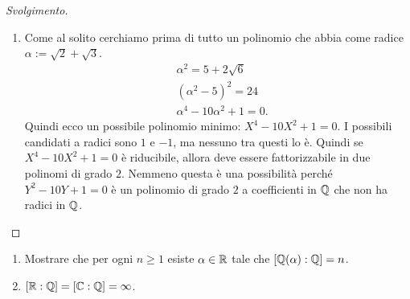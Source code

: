 \begin{proof}[Svolgimento]
\begin{enumerate}
\item Come al solito cerchiamo prima di tutto un polinomio che abbia come radice \(\alpha := \sqrt2 + \sqrt3\).
\begin{align*}
& \alpha^2=5+2\sqrt{6} \\
& (\alpha^2 - 5)^2 = 24 \\
& \alpha^4 -10\alpha^2+1 = 0 .
\end{align*}
Quindi ecco un possibile polinomio minimo: \(X^4 -10X^2+1 = 0\). I possibili candidati a radici sono \(1\) e \(-1\), ma nessuno tra questi lo è. Quindi se \(X^4 -10X^2+1 = 0\) è riducibile, allora deve essere fattorizzabile in due polinomi di grado \(2\). Nemmeno questa è una possibilità perché \(Y^2-10Y+1 = 0\) è un polinomio di grado \(2\) a coefficienti in \(\Q\) che non ha radici in \(\Q\).\qedhere
\end{enumerate}
\end{proof}

\begin{eser}[Estensioni di \(\Q\)]
\begin{enumerate}
\item Mostrare che  per ogni \(n\ge 1\) esiste \(\alpha \in \mathbb{R}\) tale che \([\mathbb{Q}(\alpha):\mathbb{Q}] = n\).
\item \([\mathbb{R}:\mathbb{Q}] = [\mathbb{C}:\mathbb{Q}]=\infty\).
\end{enumerate}
\end{eser}

